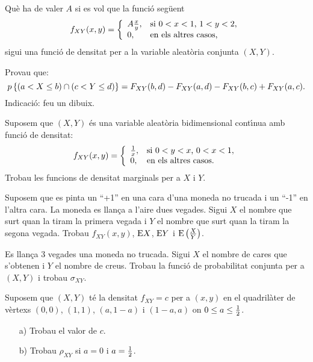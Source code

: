 \begin{prob}
{Qu\`e ha de valer $A$ si es vol que la funci\'o seg\"uent
$$f_{XY}(x,y)=
\left\{\begin{array}{ll}
A {x\over y}, & \text{si $0<x<1$, $1<y<2$}, \\ 0, & \text{en els
altres casos,}
\end{array}\right.
$$sigui una funci\'o de densitat per a la variable aleat\`oria conjunta
$(X,Y)$.} 
\end{prob}

\begin{prob}
{Provau que: $$\pp{(a<X\leq b)\cap (c<Y\leq d)}=
F_{XY}(b,d)-F_{XY}(a,d)-F_{XY}(b,c)+F_{XY}(a,c).$$\newline
{\footnotesize Indicaci\'o: feu un dibuix.}}
\end{prob}

\begin{prob}
{Suposem que $(X,Y)$ \'es una variable aleat\`oria bidimensional
cont\'{\i}nua amb funci\'o de densitat: $$f_{XY}(x,y)=
\left\{\begin{array}{ll}
{1\over x}, & \text{si
$0<y<x$, $0<x<1$},\\
0, & \text{en els altres casos.}
\end{array}\right.
$$Trobau les funcions de
densitat marginals per a $X$ i $Y$.} 
\end{prob}

\begin{prob}
{Suposem que es pinta un ``+1'' en una cara
d'una moneda no trucada i un ``-1'' en l'altra cara. La moneda es llan\c{c}a a
l'aire dues vegades. Sigui $X$ el nombre que surt quan la tiram la primera
vegada i $Y$ el nombre que surt quan la tiram la segona vegada. Trobau
$f_{XY}(x,y)$, $\EE X$, $\EE Y$ i $\EE\left({X\over Y}\right)$.} 
\end{prob}

\begin{prob}
{Es llan\c{c}a 3 vegades una moneda no trucada. Sigui $X$ el nombre de
cares que s'obtenen i $Y$ el nombre de creus. Trobau la funci\'o
de probabilitat conjunta per a $(X,Y)$ i trobau $\sigma_{XY}$.} 
\end{prob}

\begin{prob}
{Suposem que
$(X,Y)$ t\'e la densitat $f_{XY}=c$ per a $(x,y)$ en el quadril\`ater de
v\`ertexs $(0,0)$, $(1,1)$, $(a,1-a)$ i $(1-a,a)$ on $0\leq a\leq {1\over
2}$.\begin{itemize}
\item[a)] {Trobau el valor de $c$.} 
\item[b)] {Trobau $\rho_{XY}$ si $a=0$ i $a={1\over 2}$.}
\end{itemize}
}
\end{prob}

